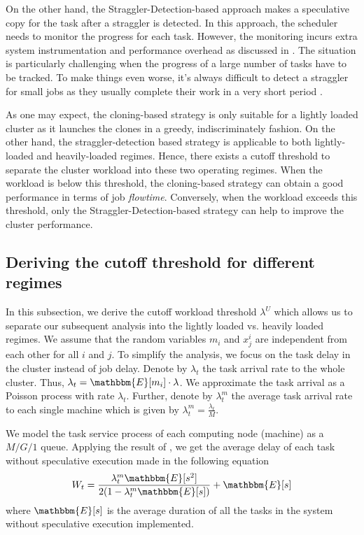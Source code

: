 \documentclass[10pt,conference]{IEEEtran}
\begin{document}
On the other hand, the Straggler-Detection-based approach makes a speculative copy for the task after a straggler is detected. In this approach, the scheduler needs to monitor the progress for each task.  However, the monitoring incurs extra system instrumentation and performance overhead as discussed in {\cite{Monitoring}}. The situation is particularly challenging when the progress of a large number of tasks have to be tracked.  To make things even worse, it's always difficult to detect a straggler for small jobs as they usually complete their work in a very short period {\cite{Cloning}}.

As one may expect, the cloning-based strategy is only suitable for a lightly loaded cluster as it launches the clones in a greedy, indiscriminately fashion. On the other hand,  the straggler-detection based strategy is applicable to both lightly-loaded and heavily-loaded regimes. Hence, there exists a cutoff threshold to separate the cluster workload into these two operating regimes. When the workload is below this threshold, the cloning-based strategy can obtain a good performance in terms of job \textit{flowtime}.  Conversely, when the workload exceeds this threshold, only the Straggler-Detection-based strategy can help to improve the cluster performance.

\subsection{Deriving the cutoff threshold for different regimes}
In this subsection, we derive the cutoff workload threshold $\lambda^U$ which allows us to separate our subsequent analysis into the lightly loaded vs. heavily loaded regimes.  We assume that the random variables $m_i$ and $x^i_j$ are independent from each other for all $i$ and $j$. To simplify the analysis, we focus on the task delay in the cluster instead of job delay. Denote by $\lambda_t$ the task arrival rate to the whole cluster. Thus, $\lambda_t = \mathbbm{E}[m_i]\cdot \lambda$. We approximate the task arrival as a Poisson process with rate $\lambda_t$. Further, denote by $\lambda^m_t$ the average task arrival rate to each single machine which is given by $\lambda^m_t = \frac{\lambda_t}{M}$.

We model the task service process of each computing node (machine) as a $M/G/1$ queue. Applying the result of {\cite{queueing_theory}}, we get the average delay of each task without speculative execution made in the following equation
\begin{equation}
W_t = \frac{\lambda^m_t \mathbbm{E}[s^2]}{2(1-\lambda^m_t \mathbbm{E}[s])} + \mathbbm{E}[s]
\label{delay}
\end{equation}
where $\mathbbm{E}[s]$ is the average duration of all the tasks in the system without speculative execution implemented.
\end{document}
